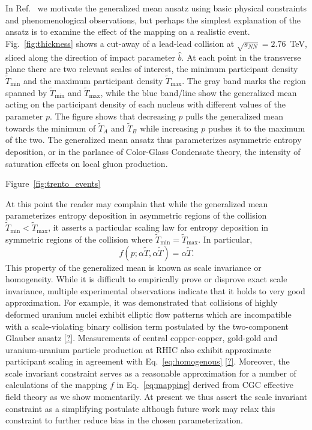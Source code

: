 \documentclass[aps,prc,reprint,amsmath,nofootinbib,superscriptaddress]{revtex4-1}
\newcommand{\sqrts}{\sqrt{s_{NN}}}
\newcommand{\T}{\tilde{T}}
\begin{document}
In Ref.~\cite{Moreland:2014oya} we motivate the generalized mean ansatz using basic physical constraints and phenomenological observations, but perhaps the simplest explanation of the ansatz is to examine the effect of the mapping on a realistic event. Fig.~\ref{fig:thickness} shows a cut-away of a lead-lead collision at $\sqrts=2.76$~TeV, sliced along the direction of impact parameter $\hat{b}$. At each point in the transverse plane there are two relevant scales of interest, the minimum participant density $\T_\text{min}$ and the maximum participant density $\T_\text{max}$. The gray band marks the region spanned by $\T_\text{min}$ and $\T_\text{max}$, while the blue band/line show the generalized mean acting on the participant density of each nucleus with different values of the parameter $p$. The figure shows that decreasing $p$ pulls the generalized mean towards the minimum of $\T_A$ and $\T_B$ while increasing $p$ pushes it to the maximum of the two. The generalized mean ansatz thus parameterizes asymmetric entropy deposition, or in the parlance of Color-Glass Condensate theory, the intensity of saturation effects on local gluon production.

Figure~\ref{fig:trento_events}

At this point the reader may complain that while the generalized mean parameterizes entropy deposition in asymmetric regions of the collision $\T_\text{min} < \T_\text{max}$, it asserts a particular scaling law for entropy deposition in symmetric regions of the collision where $\T_\text{min} = \T_\text{max}$. In particular,
\begin{equation}
  f(p; \alpha \T, \alpha \T) = \alpha \T.
  \label{eq:homogenous}
\end{equation}
This property of the generalized mean is known as scale invariance or homogeneity. While it is difficult to empirically prove or disprove exact scale invariance, multiple experimental observations indicate that it holds to very good approximation. For example, it was demonstrated that collisions of highly deformed uranium nuclei exhibit elliptic flow patterns which are incompatible with a scale-violating binary collision term postulated by the two-component Glauber ansatz \ref{?}. Measurements of central copper-copper, gold-gold and uranium-uranium particle production at RHIC also exhibit approximate participant scaling in agreement with Eq.~\eqref{eq:homogenous} \ref{?}. Moreover, the scale invariant constraint serves as a reasonable approximation for a number of calculations of the mapping $f$ in Eq.~\eqref{eq:mapping} derived from CGC effective field theory as we show momentarily. At present we thus assert the scale invariant constraint as a simplifying postulate although future work may relax this constraint to further reduce bias in the chosen parameterization.
\end{document}
